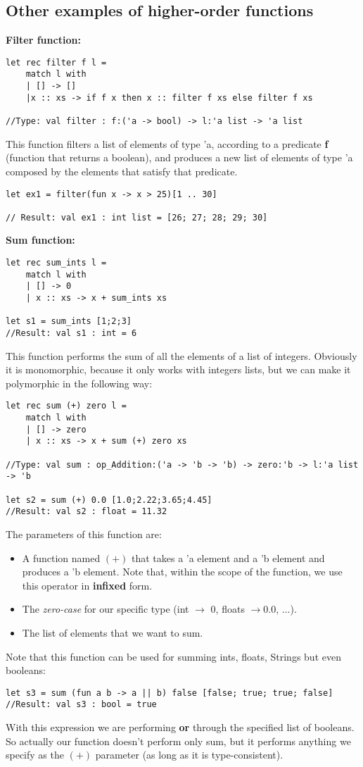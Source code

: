 \subsection{Other examples of higher-order functions}
\textbf{Filter function:}
\begin{lstlisting}
let rec filter f l = 
    match l with
    | [] -> []
    |x :: xs -> if f x then x :: filter f xs else filter f xs

//Type: val filter : f:('a -> bool) -> l:'a list -> 'a list
\end{lstlisting}
This function filters a list of elements of type 'a, according to a predicate \textbf{f} (function that returns a boolean), and produces a new list of elements of type 'a composed by the elements that satisfy that predicate.
\begin{lstlisting}
let ex1 = filter(fun x -> x > 25)[1 .. 30]

// Result: val ex1 : int list = [26; 27; 28; 29; 30]
\end{lstlisting}
\textbf{Sum function:}
\begin{lstlisting}
let rec sum_ints l =
    match l with
    | [] -> 0
    | x :: xs -> x + sum_ints xs

let s1 = sum_ints [1;2;3]
//Result: val s1 : int = 6
\end{lstlisting}
This function performs the sum of all the elements of a list of integers. Obviously it is monomorphic, because it only works with integers lists, but we can make it polymorphic in the following way:
\begin{lstlisting}
let rec sum (+) zero l =
    match l with
    | [] -> zero
    | x :: xs -> x + sum (+) zero xs

//Type: val sum : op_Addition:('a -> 'b -> 'b) -> zero:'b -> l:'a list -> 'b

let s2 = sum (+) 0.0 [1.0;2.22;3.65;4.45]
//Result: val s2 : float = 11.32
\end{lstlisting}
The parameters of this function are:
\begin{itemize}
    \item A function named $(+)$ that takes a 'a element and a 'b element and produces a 'b element. Note that, within the scope of the function, we use this operator in \textbf{infixed} form.
    \item The \textit{zero-case} for our specific type (int $\rightarrow$ 0, floats $\rightarrow 0.0$, ...).
    \item The list of elements that we want to sum.
\end{itemize}
Note that this function can be used for summing ints, floats, Strings but even booleans:
\begin{lstlisting}
let s3 = sum (fun a b -> a || b) false [false; true; true; false]
//Result: val s3 : bool = true
\end{lstlisting}
With this expression we are performing \textbf{or} through the specified list of booleans. So actually our function doesn't perform only sum, but it performs anything we specify as the $(+)$ parameter (as long as it is type-consistent).

